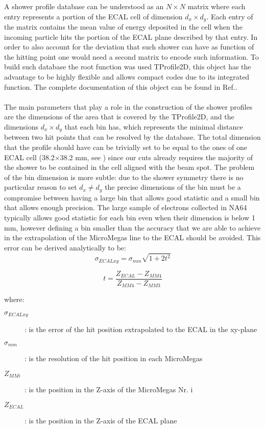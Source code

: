 A shower profile database can be understood as an $N\times N$ matrix
where each entry represents a portion of the ECAL cell of dimension
$d_x \times d_y$. Each entry of the matrix contains the mean value of
energy deposited in the cell when the incoming particle hits the
portion of the ECAL plane described by that entry. In order to also
account for the deviation that such shower can have as function of the
hitting point one would need a second matrix to encode such
information. To build such database the root function was used
TProfile2D, this object has the advantage to be highly flexible and
allows compact codes due to its integrated function. The complete
documentation of this object can be found in Ref.\cite{root-tprofile}.
\\
\\
The main parameters that play a role in the construction of the shower
profiles are the dimensions of the area that is covered by the
TProfile2D, and the dimensions $d_x \times d_y$ that each bin has,
which represents the minimal distance between two hit points that can
be resolved by the database.  The total dimension that the profile
should have can be trivially set to be equal to the ones of one ECAL
cell (38.2$\times$38.2 mm, see \cite{na64-detectors}) since our cuts
already requires the majority of the shower to be contained in the
cell aligned with the beam spot. The problem of the bin dimension is
more subtle: due to the shower symmetry there is no particular reason
to set $d_x \neq d_y$ the precise dimensions of the bin must be a
compromise between having a large bin that allows good statistic and a
small bin that allows enough precision. The large sample of electrons
collected in NA64 typically allows good statistic for each bin even
when their dimension is below 1 mm, however defining a bin smaller
than the accuracy that we are able to achieve in the extrapolation of
the MicroMegas line to the ECAL should be avoided. This error can be
derived analytically to be:
\begin{equation}
  \sigma_{ECALxy} = \sigma_{mm}\sqrt{1+2t^2}
  \label{eqn:MMerror}
\end{equation}

\begin{equation}
  t = \frac{Z_{ECAL}-Z_{MM4}}{Z_{MM4}-Z_{MM3}}
  \label{eqn:T}
\end{equation}

where:
\begin{description}
\item[$\sigma_{ECALxy}$]: is the error of the hit position
  extrapolated to the ECAL in the xy-plane
\item[$\sigma_{mm}$]: is the resolution of the hit position in each
  MicroMegas
\item[$Z_{MMi}$]: is the position in the Z-axis of the MicroMegas
  Nr. i
\item[$Z_{ECAL}$]: is the position in the Z-axis of the ECAL plane
\end{description}


